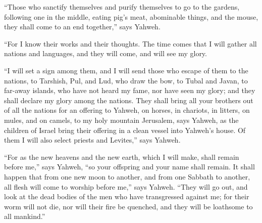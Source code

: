  ``Those who sanctify themselves and purify themselves to
go to the gardens, following one in the middle, eating pig's meat,
abominable things, and the mouse, they shall come to an end together,''
says Yahweh.

 ``For I know their works and their thoughts. The time
comes that I will gather all nations and languages, and they will come,
and will see my glory.

 ``I will set a sign among them, and I will send those
who escape of them to the nations, to Tarshish, Pul, and Lud, who draw
the bow, to Tubal and Javan, to far-away islands, who have not heard my
fame, nor have seen my glory; and they shall declare my glory among the
nations.  They shall bring all your brothers out of all
the nations for an offering to Yahweh, on horses, in chariots, in
litters, on mules, and on camels, to my holy mountain Jerusalem, says
Yahweh, as the children of Israel bring their offering in a clean vessel
into Yahweh's house.  Of them I will also select priests
and Levites,'' says Yahweh.

 ``For as the new heavens and the new earth, which I will
make, shall remain before me,'' says Yahweh, ``so your offspring and
your name shall remain.  It shall happen that from one
new moon to another, and from one Sabbath to another, all flesh will
come to worship before me,'' says Yahweh.  ``They will go
out, and look at the dead bodies of the men who have transgressed
against me; for their worm will not die, nor will their fire be
quenched, and they will be loathsome to all mankind.''

